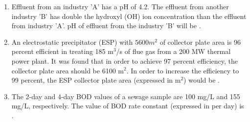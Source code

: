 \documentclass[journal]{IEEEtran}
\begin{document}
\begin{enumerate}[start=40]
\item Effluent from an industry 'A' has a pH of 4.2. The effluent from another industry 'B' has double the hydroxyl (OH) ion concentration than the effluent from industry 'A'. pH of effluent from the industry 'B' will be \underline{\hspace{3cm}}.\\

\item An electrostatic precipitator (ESP) with $5600 m^{2}$ of collector plate area is 96 percent efficient in treating 185 m$^{3}$/s of flue gas from a 200 MW thermal power plant. It was found that in order to achieve 97 percent efficiency, the collector plate area should be 6100 m$^{2}$. In order to increase the efficiency to 99 percent, the ESP collector plate area (expressed in m$^{2}$) would be \underline{\hspace{3cm}}.\\

\item The 2-day and 4-day BOD values of a sewage sample are 100 mg/L and 155 mg/L, respectively. The value of BOD rate constant (expressed in per day) is \underline{\hspace{3cm}}. \\

\end{enumerate}
\end{document}
